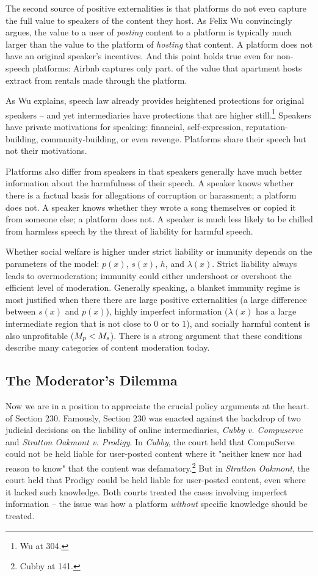 The second source of positive externalities is that platforms do not even capture the full value to speakers of the content they host. As Felix Wu convincingly argues, the value to a user of \emph{posting} content to a platform is typically much larger than the value to the platform of \emph{hosting} that content. A platform does not have an original speaker's incentives. And this point holds true even for non-speech platforms: Airbnb captures only part. of the value that apartment hosts extract from rentals made through the platform.

As Wu explains, speech law already provides heightened protections for original speakers -- and yet intermediaries have protections that are higher still.\footnote{Wu at 304.} Speakers have private motivations for speaking: financial, self-expression, reputation-building, community-building, or even revenge. Platforms share their speech but not their motivations.

Platforms also differ from speakers in that speakers generally have much better information about the harmfulness of their speech. A speaker knows whether there is a factual basis for allegations of corruption or harassment; a platform does not. A speaker knows whether they wrote a song themselves or copied it from someone else; a platform does not. A speaker is much less likely to be chilled from harmless speech by the threat of liability for harmful speech.

Whether social welfare is higher under strict liability or immunity depends on the parameters of the model:  $p(x)$, $s(x)$, $h$, and $\lambda(x)$. Strict liability always leads to overmoderation; immunity could either undershoot or overshoot the efficient level of moderation. Generally speaking, a blanket immunity regime is most justified when there there are large positive externalities (a large difference between $s(x)$ and $p(x)$), highly imperfect information ($\lambda(x)$ has a large intermediate region that is not close to $0$ or to $1$), and socially harmful content is also unprofitable ($M_p < M_s$).
 There is a strong argument that these conditions describe many categories of content moderation today.

\subsection{The Moderator's Dilemma}
\label{sec:dilemma}

Now we are in a position to appreciate the crucial policy arguments at the heart. of Section 230. Famously, Section 230 was enacted against the backdrop of two judicial decisions on the liability of online intermediaries, \emph{Cubby v. Compuserve} and \emph{Stratton Oakmont v. Prodigy}. In \emph{Cubby}, the court held that CompuServe could not be held liable for user-posted content where it "neither knew nor had reason to know" that the content was defamatory.\footnote{Cubby at 141.} But in \emph{Stratton Oakmont}, the court held that Prodigy could be held liable for user-posted content, even where it lacked such knowledge. Both courts treated the cases involving imperfect information -- the issue was how a platform \emph{without} specific knowledge should be treated.

